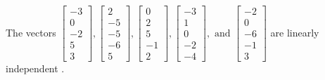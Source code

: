 \begin{exercise}
\begin{exerciseStatement}
  \end{exerciseStatement}
  \begin{exerciseAnswer}
   The vectors \(\left[\begin{array}{r}
-3 \\
0 \\
-2 \\
5 \\
3
\end{array}\right] , \left[\begin{array}{r}
2 \\
-5 \\
-5 \\
-6 \\
5
\end{array}\right] , \left[\begin{array}{r}
0 \\
2 \\
5 \\
-1 \\
2
\end{array}\right] , \left[\begin{array}{r}
-3 \\
1 \\
0 \\
-2 \\
-4
\end{array}\right] , \text{ and } \left[\begin{array}{r}
-2 \\
0 \\
-6 \\
-1 \\
3
\end{array}\right]\) are 
  	 linearly independent  .
  


  \end{exerciseAnswer}
\end{exercise}